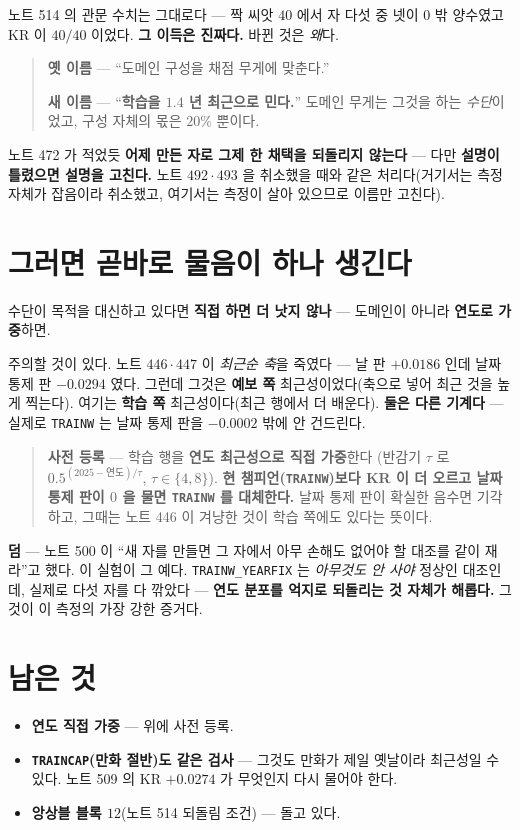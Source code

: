 \documentclass[11pt]{article}
\begin{document}
노트 514 의 관문 수치는 그대로다 --- 짝 씨앗 $40$ 에서 자 다섯 중 넷이
$0$ 밖 양수였고 KR 이 $40/40$ 이었다. \textbf{그 이득은 진짜다.} 바뀐 것은
\emph{왜}다.

\begin{quote}
\textbf{옛 이름} --- ``도메인 구성을 채점 무게에 맞춘다.''

\textbf{새 이름} --- ``\textbf{학습을 $1.4$ 년 최근으로 민다.}'' 도메인
무게는 그것을 하는 \emph{수단}이었고, 구성 자체의 몫은 $20\%$ 뿐이다.
\end{quote}

노트 472 가 적었듯 \textbf{어제 만든 자로 그제 한 채택을 되돌리지
않는다} --- 다만 \textbf{설명이 틀렸으면 설명을 고친다.} 노트 $492 \cdot
493$ 을 취소했을 때와 같은 처리다(거기서는 측정 자체가 잡음이라 취소했고,
여기서는 측정이 살아 있으므로 이름만 고친다).

\section{그러면 곧바로 물음이 하나 생긴다}

수단이 목적을 대신하고 있다면 \textbf{직접 하면 더 낫지 않나} --- 도메인이
아니라 \textbf{연도로 가중}하면.

주의할 것이 있다. 노트 $446 \cdot 447$ 이 \emph{최근순 축}을 죽였다 --- 날
판 $+0.0186$ 인데 날짜 통제 판 $-0.0294$ 였다. 그런데 그것은 \textbf{예보
쪽} 최근성이었다(축으로 넣어 최근 것을 높게 찍는다). 여기는
\textbf{학습 쪽} 최근성이다(최근 행에서 더 배운다). \textbf{둘은 다른
기계다} --- 실제로 \texttt{TRAINW} 는 날짜 통제 판을 $-0.0002$ 밖에 안
건드린다.

\begin{quote}
\textbf{사전 등록} --- 학습 행을 \textbf{연도 최근성으로 직접 가중}한다
(반감기 $\tau$ 로 $0.5^{(2025-\text{연도})/\tau}$, $\tau \in \{4, 8\}$).
\textbf{현 챔피언(\texttt{TRAINW})보다 KR 이 더 오르고 날짜 통제 판이
$0$ 을 물면 \texttt{TRAINW} 를 대체한다.} 날짜 통제 판이 확실한 음수면
기각하고, 그때는 노트 446 이 겨냥한 것이 학습 쪽에도 있다는 뜻이다.
\end{quote}

\textbf{덤} --- 노트 500 이 ``새 자를 만들면 그 자에서 아무 손해도 없어야
할 대조를 같이 재라''고 했다. 이 실험이 그 예다. \texttt{TRAINW\_YEARFIX}
는 \emph{아무것도 안 사야} 정상인 대조인데, 실제로 다섯 자를 다 깎았다 ---
\textbf{연도 분포를 억지로 되돌리는 것 자체가 해롭다.} 그것이 이 측정의
가장 강한 증거다.

\section*{남은 것}

\begin{itemize}
\item \textbf{연도 직접 가중} --- 위에 사전 등록.
\item \textbf{\texttt{TRAINCAP}(만화 절반)도 같은 검사} --- 그것도 만화가
제일 옛날이라 최근성일 수 있다. 노트 509 의 KR $+0.0274$ 가 무엇인지
다시 물어야 한다.
\item \textbf{앙상블 블록 $12$}(노트 514 되돌림 조건) --- 돌고 있다.
\end{itemize}
\end{document}
